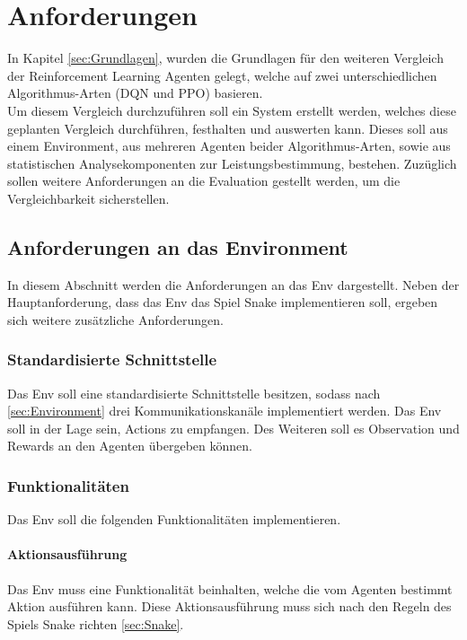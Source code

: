 \chapter{Anforderungen} \label{chap:Anforderungen}
In Kapitel \ref{sec:Grundlagen}, wurden die Grundlagen für den weiteren Vergleich der Reinforcement Learning Agenten gelegt, welche auf zwei unterschiedlichen Algorithmus-Arten (DQN und PPO) basieren.\\
Um diesem Vergleich durchzuführen soll ein System erstellt werden, welches diese geplanten Vergleich durchführen, festhalten und auswerten kann. Dieses soll aus einem Environment, aus mehreren Agenten beider Algorithmus-Arten, sowie aus statistischen Analysekomponenten zur Leistungsbestimmung, bestehen. Zuzüglich sollen weitere Anforderungen an die Evaluation gestellt werden, um die Vergleichbarkeit sicherstellen.

\section{Anforderungen an das Environment} \label{sec:Anforderungen_Env}
In diesem Abschnitt werden die Anforderungen an das Env dargestellt. Neben der Hauptanforderung, dass das Env das Spiel Snake implementieren soll, ergeben sich weitere zusätzliche Anforderungen.

\subsection{Standardisierte Schnittstelle} \label{sec:Anforderungen_Schnittstelle}
Das Env soll eine standardisierte Schnittstelle besitzen, sodass nach \ref{sec:Environment} drei Kommunikationskanäle implementiert werden. Das Env soll in der Lage sein, Actions zu empfangen. Des Weiteren soll es Observation und Rewards an den Agenten übergeben können.

\subsection{Funktionalitäten} \label{sec:funktionalität_Env}
Das Env soll die folgenden Funktionalitäten implementieren.

\subsubsection{Aktionsausführung}
Das Env muss eine Funktionalität beinhalten, welche die vom Agenten bestimmt Aktion ausführen kann. Diese Aktionsausführung muss sich nach den Regeln des Spiels Snake richten \ref{sec:Snake}.

